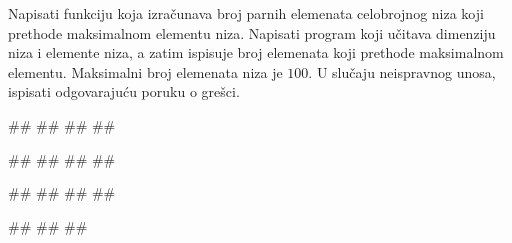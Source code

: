 \begin{Exercise}[label=p.broj_manjih_od_maksimuma] 
 Napisati funkciju koja izračunava broj parnih elemenata celobrojnog niza
 koji prethode maksimalnom elementu niza.
 Napisati program koji učitava dimenziju niza i elemente niza, a zatim ispisuje broj
 elemenata koji prethode maksimalnom elementu. Maksimalni broj elemenata niza je $100$.
U slučaju neispravnog unosa, ispisati odgovarajuću poruku o grešci. 

\begin{miditest}
\begin{upotreba}{1}
#\naslovInt#
##
##
##
\end{upotreba}
\end{miditest}
\begin{miditest}
\begin{upotreba}{2}
#\naslovInt#
##
##
##
\end{upotreba}
\end{miditest}

\begin{miditest}
\begin{upotreba}{3}
#\naslovInt#
##
##
##
\end{upotreba}
\end{miditest}
\begin{miditest}
\begin{upotreba}{4}
#\naslovInt#
##
##
\end{upotreba}
\end{miditest}

\end{Exercise}

\ifresenja
\begin{Answer}[ref=p.broj_manjih_od_maksimuma]
\end{Answer}
\fi


